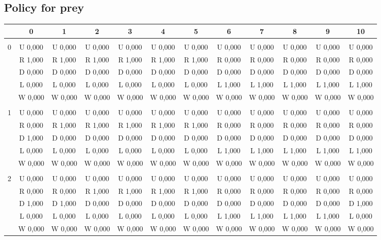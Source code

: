 \subsection{Policy for prey}
 \begin{table}[htbp]
\label{policyLabelPrey}
\centering
\begin{tiny}
\begin{tabular}{c|c|c|c|c|c|c|c|c|c|c|c|}
&0&1&2&3&4&5&6&7&8&9&10\\ \hline\\
0&U 0,000&U 0,000&U 0,000&U 0,000&U 0,000&U 0,000&U 0,000&U 0,000&U 0,000&U 0,000&U 0,000\\
&R 1,000&R 1,000&R 1,000&R 1,000&R 1,000&R 1,000&R 0,000&R 0,000&R 0,000&R 0,000&R 0,000\\
&D 0,000&D 0,000&D 0,000&D 0,000&D 0,000&D 0,000&D 0,000&D 0,000&D 0,000&D 0,000&D 0,000\\
&L 0,000&L 0,000&L 0,000&L 0,000&L 0,000&L 0,000&L 1,000&L 1,000&L 1,000&L 1,000&L 1,000\\
&W 0,000&W 0,000&W 0,000&W 0,000&W 0,000&W 0,000&W 0,000&W 0,000&W 0,000&W 0,000&W 0,000\\
\hline \\
1&U 0,000&U 0,000&U 0,000&U 0,000&U 0,000&U 0,000&U 0,000&U 0,000&U 0,000&U 0,000&U 0,000\\
&R 0,000&R 1,000&R 1,000&R 1,000&R 1,000&R 1,000&R 0,000&R 0,000&R 0,000&R 0,000&R 0,000\\
&D 1,000&D 0,000&D 0,000&D 0,000&D 0,000&D 0,000&D 0,000&D 0,000&D 0,000&D 0,000&D 0,000\\
&L 0,000&L 0,000&L 0,000&L 0,000&L 0,000&L 0,000&L 1,000&L 1,000&L 1,000&L 1,000&L 1,000\\
&W 0,000&W 0,000&W 0,000&W 0,000&W 0,000&W 0,000&W 0,000&W 0,000&W 0,000&W 0,000&W 0,000\\
\hline \\
2&U 0,000&U 0,000&U 0,000&U 0,000&U 0,000&U 0,000&U 0,000&U 0,000&U 0,000&U 0,000&U 0,000\\
&R 0,000&R 0,000&R 1,000&R 1,000&R 1,000&R 1,000&R 0,000&R 0,000&R 0,000&R 0,000&R 0,000\\
&D 1,000&D 1,000&D 0,000&D 0,000&D 0,000&D 0,000&D 0,000&D 0,000&D 0,000&D 0,000&D 1,000\\
&L 0,000&L 0,000&L 0,000&L 0,000&L 0,000&L 0,000&L 1,000&L 1,000&L 1,000&L 1,000&L 0,000\\
&W 0,000&W 0,000&W 0,000&W 0,000&W 0,000&W 0,000&W 0,000&W 0,000&W 0,000&W 0,000&W 0,000\\

\end{tabular}
\end{tiny}
\end{table}
